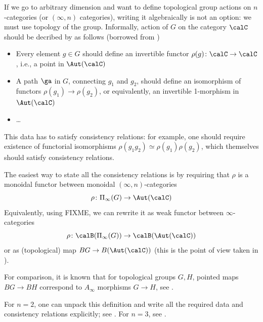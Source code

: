 

If we go to arbitrary dimension and want to define topological group actions on
$n$-categories (or $(\infty,n)$ categories), writing it algebraically is not an
option: we must use topology of the group. Informally, action of $G$ on the
category $\calC$ should be decribed by as follows (borrowed from
\cite[Section 16]{schommer-pries-category})

\begin{itemize}
  \item Every element $g\in G$ should define an invertible functor
    $\rho(g)\colon \calC\to \calC$, i.e., a point in $\Aut(\calC)$
  \item A path $\ga$ in $G$, connecting $g_1$ and $g_2$, should define
    an isomorphism of functors $\rho(g_1)\to \rho(g_2)$, or equivalently, an
    invertible 1-morphism in $\Aut(\calC)$
  \item \dots
\end{itemize}
This data has to satisfy consistency relations: for example, one should require
existence of functorial isomorphisms $\rho(g_1g_2)\simeq \rho(g_1)\rho(g_2)$,
which themselves should satisfy consistency relations.

The easiest way to state all the consistency relations is by requiring that
$\rho$ is a monoidal functor between monoidal $(\infty, n)$-categories
$$
  \rho\colon \Pi_\infty(G)\to \Aut(\calC)
$$
Equivalently, using FIXME, we can rewrite it as weak functor between
$\infty$-categories
$$
\rho\colon \calB(\Pi_\infty(G) )\to \calB(\Aut(\calC))
$$
or as (topological) map $BG\to B(\Aut(\calC))$
(this is the point of view taken in \cite{schommer-pries-category}).


\begin{remark}\label{r:Ainfty}
  For comparison, it is known that  for  topological groups $G,H$,
  pointed maps $BG\to BH$ correspond to $A_\infty$ morphisms $G\to H$, see
  \cite[Propositions 1.15, 1.16]{boardman-vogt}.
\end{remark}


For $n=2$, one can unpack this definition and write all the required data
and consistency relations explicitly; see \cite[Remark 2.16]{hesse}.
For $n=3$, see \cite{schommer-pries-category}.



